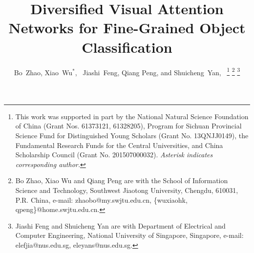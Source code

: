 \documentclass[journal]{IEEEtran}
\begin{document}
\title{Diversified Visual Attention Networks for Fine-Grained Object Classification}

\author{Bo~Zhao, Xiao~Wu$^{*}$,~
        Jiashi~Feng, %
        Qiang Peng,
        and Shuicheng~Yan,~%
\thanks{
This work was supported in part by the National Natural Science Foundation of China (Grant Nos. 61373121, 61328205), Program for Sichuan Provincial Science Fund for Distinguished Young Scholars (Grant No. 13QNJJ0149), the Fundamental
Research Funds for the Central Universities, and China Scholarship Council (Grant No. 201507000032). \emph{Asterisk indicates corresponding author.}}
\thanks{Bo Zhao, Xiao Wu and Qiang Peng are with the School of Information Science and Technology, Southwest Jiaotong University, Chengdu, 610031, P.R. China, e-mail: zhaobo@my.swjtu.edu.cn, \{wuxiaohk, qpeng\}@home.swjtu.edu.cn.}%
\thanks{Jiashi Feng and Shuicheng Yan are with Department of Electrical and Computer Engineering, National University of Singapore, Singapore, e-mail: elefjia@nus.edu.sg, eleyans@nus.edu.sg.}%
}
\maketitle
\end{document}
